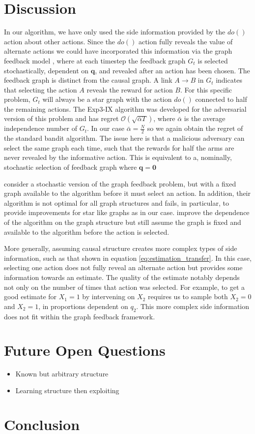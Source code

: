 \documentclass{article}
\newcommand{\bigo}[1]{\mathcal{O}\left( #1 \right)}
\theoremstyle{plain}
\theoremstyle{definition}
\begin{document}
\section{Discussion}


In our algorithm, we have only used the side information provided by the $do()$ action about other actions. Since the $do()$ action fully reveals the value of alternate actions we could have incorporated this information via the graph feedback model \cite{Mannor2011}, where at each timestep the feedback graph $G_t$ is selected stochastically, dependent on $\boldsymbol{q}$, and revealed after an action has been chosen. The feedback graph is distinct from the causal graph. A link $A \rightarrow B$ in $G_t$ indicates that selecting the action $A$ reveals the reward for action $B$. For this specific problem, $G_t$ will always be a star graph with the action $do()$ connected to half the remaining actions. The Exp3-IX algorithm \cite{Kocak2014} was developed for the adversarial version of this problem and has regret $\bigo{\sqrt{\bar{\alpha}T}}$, where $\bar{\alpha}$ is the average independence number of $G_t$. In our case $\bar{\alpha} = \frac{N}{2}$ so we again obtain the regret of the standard bandit algorithm. The issue here is that a malicious adversary can select the same graph each time, such that the rewards for half the arms are never revealed by the informative action. This is equivalent to a, nominally, stochastic selection of feedback graph where $\boldsymbol{q} = \boldsymbol{0}$

\cite{Lelarge2012} consider a stochastic version of the graph feedback problem, but with a fixed graph available to the algorithm before it must select an action. In addition, their algorithm is not optimal for all graph structures and fails, in particular, to provide improvements for star like graphs as in our case. \cite{Buccapatnam2014} improve the dependence of the algorithm on the graph structure but still assume the graph is fixed and available to the algorithm before the action is selected. 

More generally, assuming causal structure creates more complex types of side information, such as that shown in equation \ref{eq:estimation_transfer}. In this case, selecting one action does not fully reveal an alternate action but provides some information towards an estimate. The quality of the estimate notably depends not only on the number of times that action was selected. For example, to get a good estimate for $X_1 = 1$ by intervening on $X_2$ requires us to sample both $X_2=0$ and $X_2=1$, in proportions dependent on $q_2$. This more complex side information does not fit within the graph feedback framework.


\section{Future Open Questions}
\begin{itemize}
\item Known but arbitrary structure
\item Learning structure then exploiting
\end{itemize}
\section{Conclusion}



\end{document}
